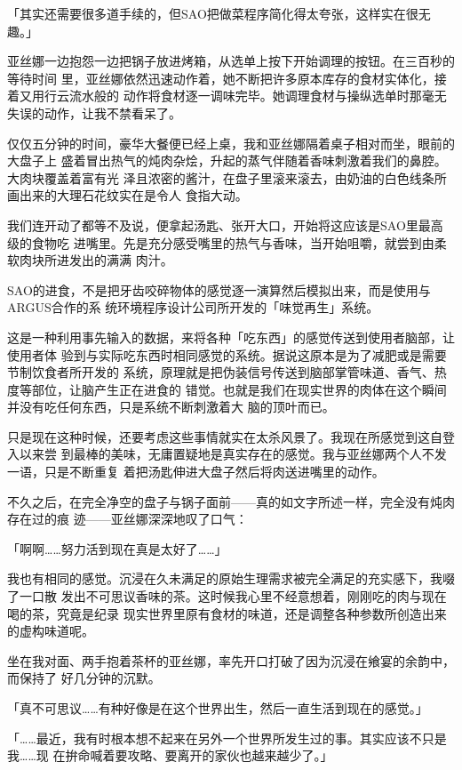\documentclass[11pt]{book}
\begin{document}
「其实还需要很多道手续的，但SAO把做菜程序简化得太夸张，这样实在很无趣。」

亚丝娜一边抱怨一边把锅子放进烤箱，从选单上按下开始调理的按钮。在三百秒的等待时间
里，亚丝娜依然迅速动作着，她不断把许多原本库存的食材实体化，接着又用行云流水般的
动作将食材逐一调味完毕。她调理食材与操纵选单时那毫无失误的动作，让我不禁看呆了。

仅仅五分钟的时间，豪华大餐便已经上桌，我和亚丝娜隔着桌子相对而坐，眼前的大盘子上
盛着冒出热气的炖肉杂烩，升起的蒸气伴随着香味刺激着我们的鼻腔。大肉块覆盖着富有光
泽且浓密的酱汁，在盘子里滚来滚去，由奶油的白色线条所画出来的大理石花纹实在是令人
食指大动。

我们连开动了都等不及说，便拿起汤匙、张开大口，开始将这应该是SAO里最高级的食物吃
进嘴里。先是充分感受嘴里的热气与香味，当开始咀嚼，就尝到由柔软肉块所进发出的满满
肉汁。

SAO的进食，不是把牙齿咬碎物体的感觉逐一演算然后模拟出来，而是使用与ARGUS合作的系
统环境程序设计公司所开发的「味觉再生」系统。

这是一种利用事先输入的数据，来将各种「吃东西」的感觉传送到使用者脑部，让使用者体
验到与实际吃东西时相同感觉的系统。据说这原本是为了减肥或是需要节制饮食者所开发的
系统，原理就是把伪装信号传送到脑部掌管味道、香气、热度等部位，让脑产生正在进食的
错觉。也就是我们在现实世界的肉体在这个瞬间并没有吃任何东西，只是系统不断刺激着大
脑的顶叶而已。

只是现在这种时候，还要考虑这些事情就实在太杀风景了。我现在所感觉到这自登入以来尝
到最棒的美味，无庸置疑地是真实存在的感觉。我与亚丝娜两个人不发一语，只是不断重复
着把汤匙伸进大盘子然后将肉送进嘴里的动作。

不久之后，在完全净空的盘子与锅子面前——真的如文字所述一样，完全没有炖肉存在过的痕
迹——亚丝娜深深地叹了口气：

「啊啊……努力活到现在真是太好了……」

我也有相同的感觉。沉浸在久未满足的原始生理需求被完全满足的充实感下，我啜了一口散
发出不可思议香味的茶。这时候我心里不经意想着，刚刚吃的肉与现在喝的茶，究竟是纪录
现实世界里原有食材的味道，还是调整各种参数所创造出来的虚构味道呢。

坐在我对面、两手抱着茶杯的亚丝娜，率先开口打破了因为沉浸在飨宴的余韵中，而保持了
好几分钟的沉默。

「真不可思议……有种好像是在这个世界出生，然后一直生活到现在的感觉。」

「……最近，我有时根本想不起来在另外一个世界所发生过的事。其实应该不只是我……现
在拚命喊着要攻略、要离开的家伙也越来越少了。」
\end{document}
